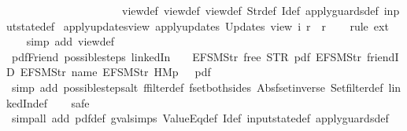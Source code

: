 \begin{isabellebody}
\ \ \ \ \ \ \ \ \ \ \ \ \ \ \ \ \ \ \ \ \ view{}{\isacharunderscore}def\ view{}{\isacharunderscore}def\ view{\isacharunderscore}def\ Str{\isacharunderscore}def\ I{\isacharunderscore}def\ apply{\isacharunderscore}guards{\isacharunderscore}def\ input{}state{\isacharunderscore}def{\isacharparenright}%
\endisatagproof
{\isafoldproof}%
%
\isadelimproof
\isanewline
%
\endisadelimproof
\isanewline
{}\isamarkupfalse%
\ apply{\isacharunderscore}updates{\isacharunderscore}view{\isacharcolon}\ {\isachardoublequoteopen}apply{\isacharunderscore}updates\ {\isacharparenleft}Updates\ view{\isacharparenright}\ i\ r\ {\isacharequal}\ r{\isachardoublequoteclose}\isanewline
%
\isadelimproof
\ \ %
\endisadelimproof
%
\isatagproof
{}\isamarkupfalse%
\ {\isacharparenleft}rule\ ext{\isacharparenright}\isanewline
\ \ \isamarkupfalse%
\ {\isacharparenleft}simp\ add{\isacharcolon}\ view{\isacharunderscore}def{\isacharparenright}%
\endisatagproof
{\isafoldproof}%
%
\isadelimproof
\isanewline
%
\endisadelimproof
\isanewline
{}\isamarkupfalse%
\ pdfFriend{\isacharcolon}\ {\isachardoublequoteopen}possible{\isacharunderscore}steps\ linkedIn\ {}\ {\isacharless}{}\ {\isacharcolon}{\isacharequal}\ EFSM{\isachardot}Str\ {\isacharprime}{\isacharprime}free{\isacharprime}{\isacharprime}{\isachargreater}\ STR\ {\isacharprime}{\isacharprime}pdf{\isacharprime}{\isacharprime}\ {\isacharbrackleft}EFSM{\isachardot}Str\ {\isacharprime}{\isacharprime}friendID{\isacharprime}{\isacharprime}{\isacharcomma}\ EFSM{\isachardot}Str\ {\isacharprime}{\isacharprime}name{\isacharprime}{\isacharprime}{\isacharcomma}\ EFSM{\isachardot}Str\ {\isacharprime}{\isacharprime}HM{}p{\isacharprime}{\isacharprime}{\isacharbrackright}\ {\isacharequal}\ {\isacharbraceleft}{\isacharbar}{\isacharparenleft}{}{\isacharcomma}\ pdf{\isacharparenright}{\isacharbar}{\isacharbraceright}{\isachardoublequoteclose}\isanewline
%
\isadelimproof
\ \ %
\endisadelimproof
%
\isatagproof
{}\isamarkupfalse%
\ {\isacharparenleft}simp\ add{\isacharcolon}\ possible{\isacharunderscore}steps{\isacharunderscore}alt\ ffilter{\isacharunderscore}def\ fset{\isacharunderscore}both{\isacharunderscore}sides\ Abs{\isacharunderscore}fset{\isacharunderscore}inverse\ Set{\isachardot}filter{\isacharunderscore}def\ linkedIn{\isacharunderscore}def{\isacharparenright}\isanewline
\ \ \isamarkupfalse%
\ safe\isanewline
\ \ \isamarkupfalse%
\ {\isacharparenleft}simp{\isacharunderscore}all\ add{\isacharcolon}\ pdf{\isacharunderscore}def\ gval{\isachardot}simps\ ValueEq{\isacharunderscore}def\ I{\isacharunderscore}def\ input{}state{\isacharunderscore}def\ apply{\isacharunderscore}guards{\isacharunderscore}def{\isacharparenright}%

\end{isabellebody}
